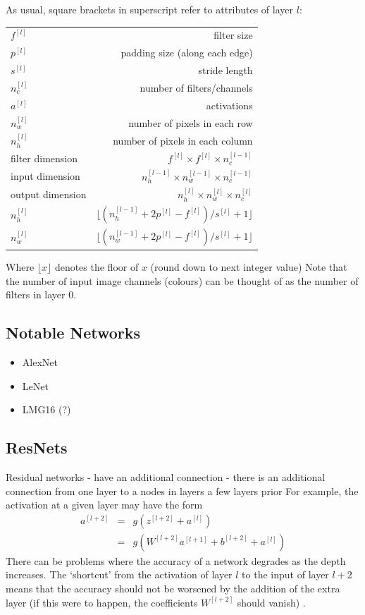 \documentclass{article}
\begin{document}
As usual, square brackets in superscript refer to attributes of layer $l$:


\begin{tabular}{lr}
$f^{[l]}$ &  filter size \\ 
$p^{[l]}$ &  padding size (along each edge)\\ 
$s^{[l]}$ &  stride length\\ 
$n_c^{[l]}$ &  number of filters/channels\\ 
$a^{[l]}$ & activations\\
$n_w^{[l]}$ & number of pixels in each row\\
$n_h^{[l]}$ & number of pixels in each column\\
filter dimension &  $f^{[l]} \times f^{[l]} \times n_c^{[l-1]}$\\ 
input dimension & $n_h^{[l-1]} \times n_w^{[l-1]} \times n_c^{[l-1]}$  \\
output dimension &  $n_h^{[l]} \times n_w^{[l]} \times n_c^{[l]}$\\
$n_h^{[l]}$ & $\lfloor(n_h^{[l-1]} + 2 p^{[l]} - f^{[l]})/s^{[l]} + 1 \rfloor$ \\
$n_w^{[l]}$ & $\lfloor(n_w^{[l-1]} + 2 p^{[l]} - f^{[l]})/s^{[l]} + 1 \rfloor$ \\
\end{tabular}

Where $\lfloor x \rfloor$ denotes the floor of $x$ (round down to next integer value)
Note that the number of input image channels (colours) can be thought of as the number of filters in layer 0.

\subsection{Notable Networks}
\begin{itemize}
    \item AlexNet
    \item LeNet
    \item LMG16 (?)
\end{itemize}
\subsection{ResNets}

Residual networks - have an additional connection - there is an additional connection from one layer to a nodes in layers a few layers prior
For example, the activation at a given layer may have the form
\begin{eqnarray*}
a^{[l+2]} &= & g( z^{[l+2]} + a^{[l]} ) \\
& = & g( W^{[l+2]} a^{[l+1]} + b^{[l+2]} + a^{[l]} )
\end{eqnarray*}
There can be problems where the accuracy of a network degrades as the depth increases. The `shortcut' from the activation of layer $l$ to the input of layer $l+2$ means that the accuracy should not be worsened by the addition of the extra layer (if this were to happen, the coefficients $W^{[l+2]}$ should vanish) .
\end{document}
